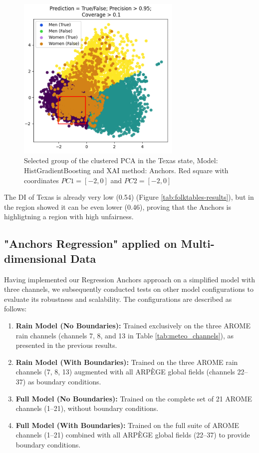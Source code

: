 \begin{figure}[h]
    \centering
    \includegraphics[width=0.7\textwidth]{Images/clustered_pca_square.png}
    \caption{Selected group of the clustered PCA in the Texas state, Model: HistGradientBoosting and XAI method: Anchors. Red square with coordinates $PC1 = [-2, 0]$ and $PC2 = [-2, 0]$}
    \label{fig:square_cluster}
\end{figure}

The DI of Texas is already very low (0.54) (Figure \ref{tab:folktables-results}), but in the region showed it can be even lower (0.46), proving that the Anchors is highligtning a region with high unfairness.

\FloatBarrier

\subsection{"Anchors Regression" applied on Multi-dimensional Data}
Having implemented our Regression Anchors approach on a simplified model with three channels, we subsequently conducted tests on other model configurations to evaluate its robustness and scalability. The configurations are described as follows:

\begin{enumerate}
\item \textbf{Rain Model (No Boundaries):} Trained exclusively on the three AROME rain channels (channels 7, 8, and 13 in Table \ref{tab:meteo_channels}), as presented in the previous results.
\item \textbf{Rain Model (With Boundaries):} Trained on the three AROME rain channels (7, 8, 13) augmented with all ARPÈGE global fields (channels 22--37) as boundary conditions.
\item \textbf{Full Model (No Boundaries):} Trained on the complete set of 21 AROME channels (1--21), without boundary conditions.
\item \textbf{Full Model (With Boundaries):} Trained on the full suite of AROME channels (1--21) combined with all ARPÈGE global fields (22--37) to provide boundary conditions.
\end{enumerate}

